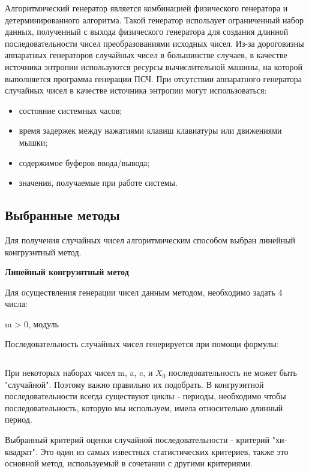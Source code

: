 \documentclass[14pt, a4paper]{extarticle}
\begin{document}
Алгоритмический генератор является комбинацией физического генератора и детерминированного алгоритма. Такой генератор использует ограниченный набор данных, полученный с выхода физического генератора для создания длинной последовательности чисел преобразованиями исходных чисел. 
Из-за дороговизны аппаратных генераторов случайных чисел в большинстве случаев, в качестве источника энтропии используются ресурсы вычислительной машины, на которой выполняется программа генерации ПСЧ. При отсутствии аппаратного генератора случайных чисел в качестве источника энтропии могут использоваться:
\begin{itemize}
    \item состояние системных часов; 
    \item время задержек между нажатиями клавиш клавиатуры или движениями мышки; 
    \item содержимое буферов ввода/вывода; 
    \item значения, получаемые при работе системы.
\end{itemize}

\subsection{Выбранные методы}

Для получения случайных чисел алгоритмическим способом выбран линейный конгруэнтный метод.

\textbf{Линейный конгруэнтный метод}

Для осуществления генерации чисел данным методом, необходимо задать 4 числа:


m > 0,  модуль





Последовательность случайных чисел генерируется при помощи формулы:

\begin{equation}
\end{equation}

При некоторых наборах чисел m, a, c, и $X_{0}$ последовательность не может быть "случайной". Поэтому важно правильно их подобрать. В конгруэнтной последовательности всегда существуют циклы - периоды, необходимо чтобы последовательность, которую мы используем, имела относительно длинный период.

Выбранный критерий оценки случайной последовательности - критерий "хи-квадрат". Это один из самых известных статистических критериев, также это основной метод, используемый в сочетании с другими критериями. 
\end{document}
